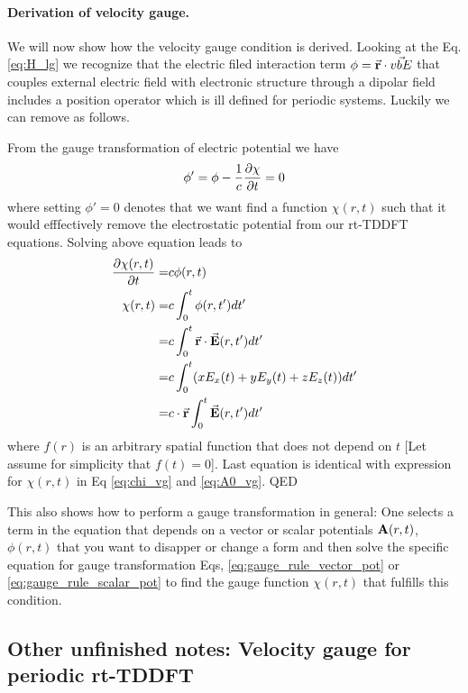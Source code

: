 \documentclass[11pt]{article}
\begin{document}
\paragraph{ Derivation of velocity gauge.}
We will now  show how the velocity gauge condition is derived.
Looking at the Eq. \ref{eq:H_lg} we recognize that the electric filed interaction term $\phi= \vec{\vb  r}\cdot \vec{vb E}$ that couples external electric field with electronic structure through a dipolar field includes a position operator which  is ill defined for periodic systems.  Luckily we can remove as follows.

From the   gauge transformation of electric potential we have
\begin{align*}
    \phi' = \phi -\frac{1}{c} \pdv{\chi}{t}  =0
\end{align*}
where  setting $\phi'=0$  denotes  that we want  find a function $\chi(r,t)$ such that  it would efffectively remove  the electrostatic potential from our rt-TDDFT equations.
Solving above equation leads to
\begin{align*}
\pdv{\chi(r,t)}{t}  =& c \phi(r,t) \\
\chi(r,t)  =& c \int_0^t \phi(r,t')  dt' \\
           =& c \int_0^t  \vec{\vb  r}\cdot \vec{\vb E}(r,t') dt' \\
           =&   c \int_0^t (x E_x(t) +  y E_y(t) +z E_z(t)) dt' \\
            =& c \cdot \vec{\vb  r} \int_0^t \vec{\vb E}(r,t') dt' %
\end{align*}
where $f(r)$ is an arbitrary spatial function that does not depend on $t$  [Let assume for simplicity that  $f(t)=0$].
Last  equation  is identical  with  expression for $\chi(r,t)$ in Eq \ref{eq:chi_vg} and \ref{eq:A0_vg}. QED



This also shows   how to perform a gauge transformation in general:  One selects  a term  in the equation that depends on  a vector  or scalar potentials $\vb A(r,t)$,  $\phi(r,t)$  that you want to disapper or change a form and then solve the specific equation  for gauge transformation Eqs, \ref{eq:gauge_rule_vector_pot}  or \ref{eq:gauge_rule_scalar_pot} to find the gauge function $\chi(r,t)$  that fulfills this condition.

\subsection{ Other unfinished notes: Velocity gauge for periodic rt-TDDFT }
\end{document}

